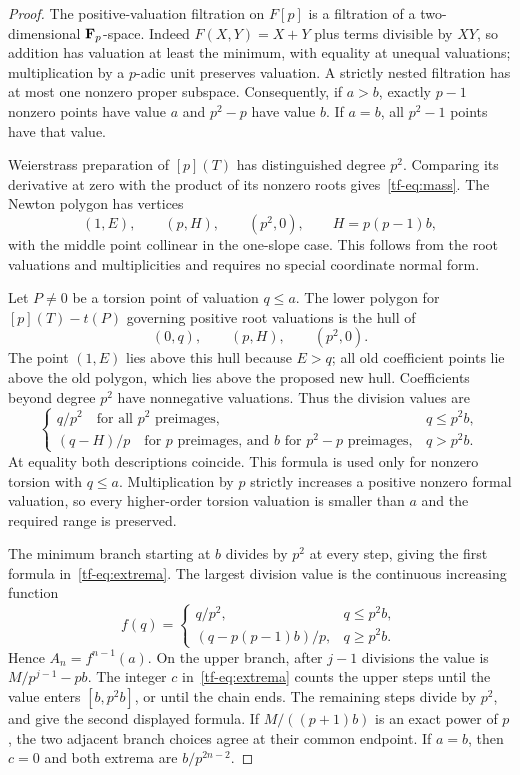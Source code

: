 \begin{proof}
The positive-valuation filtration on $F[p]$ is a filtration of a two-dimensional $\mathbf F_p$-space. Indeed $F(X,Y)=X+Y$ plus terms divisible by $XY$, so addition has valuation at least the minimum, with equality at unequal valuations; multiplication by a $p$-adic unit preserves valuation. A strictly nested filtration has at most one nonzero proper subspace. Consequently, if $a>b$, exactly $p-1$ nonzero points have value $a$ and $p^2-p$ have value $b$. If $a=b$, all $p^2-1$ points have that value.

Weierstrass preparation of $[p](T)$ has distinguished degree $p^2$. Comparing its derivative at zero with the product of its nonzero roots gives~\eqref{tf-eq:mass}. The Newton polygon has vertices
\[
 (1,E),\qquad(p,H),\qquad(p^2,0),\qquad H=p(p-1)b,
\]
with the middle point collinear in the one-slope case. This follows from the root valuations and multiplicities and requires no special coordinate normal form.

Let $P\ne0$ be a torsion point of valuation $q\le a$. The lower polygon for $[p](T)-t(P)$ governing positive root valuations is the hull of
\[
 (0,q),\qquad(p,H),\qquad(p^2,0).
\]
The point $(1,E)$ lies above this hull because $E>q$; all old coefficient points lie above the old polygon, which lies above the proposed new hull. Coefficients beyond degree $p^2$ have nonnegative valuations. Thus the division values are
\begin{equation}\label{tf-eq:division}
\begin{cases}
 q/p^2\quad\text{for all }p^2\text{ preimages},&q\le p^2b,\\
 (q-H)/p\quad\text{for }p\text{ preimages, and }b
 \text{ for }p^2-p\text{ preimages},&q>p^2b.
\end{cases}
\end{equation}
At equality both descriptions coincide. This formula is used only for nonzero torsion with $q\le a$. Multiplication by $p$ strictly increases a positive nonzero formal valuation, so every higher-order torsion valuation is smaller than $a$ and the required range is preserved.

The minimum branch starting at $b$ divides by $p^2$ at every step, giving the first formula in~\eqref{tf-eq:extrema}. The largest division value is the continuous increasing function
\[
 f(q)=\begin{cases}q/p^2,&q\le p^2b,\\
 (q-p(p-1)b)/p,&q\ge p^2b.
 \end{cases}
\]
Hence $A_n=f^{n-1}(a)$. On the upper branch, after $j-1$ divisions the value is $M/p^{j-1}-pb$. The integer $c$ in~\eqref{tf-eq:extrema} counts the upper steps until the value enters $[b,p^2b]$, or until the chain ends. The remaining steps divide by $p^2$, and give the second displayed formula. If $M/((p+1)b)$ is an exact power of $p$, the two adjacent branch choices agree at their common endpoint. If $a=b$, then $c=0$ and both extrema are $b/p^{2n-2}$.
\end{proof}

